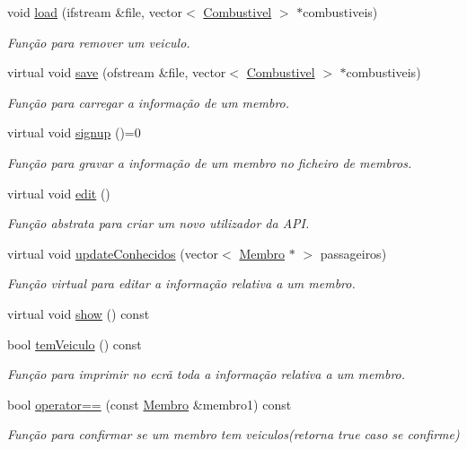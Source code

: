 \begin{DoxyCompactItemize}
void \hyperlink{class_membro_a3f6fcbde8bb6e631101e838e07240126}{load} (ifstream \&file, vector$<$ \hyperlink{class_combustivel}{Combustivel} $>$ $\ast$combustiveis)
\begin{DoxyCompactList}\small\item\em Função para remover um veiculo. \end{DoxyCompactList}\item 
virtual void \hyperlink{class_membro_a2a8ceaddac1fb7b0f894b1adc9315f03}{save} (ofstream \&file, vector$<$ \hyperlink{class_combustivel}{Combustivel} $>$ $\ast$combustiveis)
\begin{DoxyCompactList}\small\item\em Função para carregar a informação de um membro. \end{DoxyCompactList}\item 
virtual void \hyperlink{class_membro_ab88b510a234c18aa035c28f4253140b3}{signup} ()=0
\begin{DoxyCompactList}\small\item\em Função para gravar a informação de um membro no ficheiro de membros. \end{DoxyCompactList}\item 
virtual void \hyperlink{class_membro_a0e4aef4dc61b9f22b277591249714452}{edit} ()
\begin{DoxyCompactList}\small\item\em Função abstrata para criar um novo utilizador da A\+P\+I. \end{DoxyCompactList}\item 
virtual void \hyperlink{class_membro_a67dab9bc0fd069a6e3204044005c197f}{update\+Conhecidos} (vector$<$ \hyperlink{class_membro}{Membro} $\ast$ $>$ passageiros)
\begin{DoxyCompactList}\small\item\em Função virtual para editar a informação relativa a um membro. \end{DoxyCompactList}\item 
virtual void \hyperlink{class_membro_a9931c13a2894a9a62760a5dddb867997}{show} () const 
\item 
bool \hyperlink{class_membro_a2d507bc34837f55b91510a86d507d8bc}{tem\+Veiculo} () const 
\begin{DoxyCompactList}\small\item\em Função para imprimir no ecrã toda a informação relativa a um membro. \end{DoxyCompactList}\item 
bool \hyperlink{class_membro_a1561028d847eead98b720c339557262c}{operator==} (const \hyperlink{class_membro}{Membro} \&membro1) const 
\begin{DoxyCompactList}\small\item\em Função para confirmar se um membro tem veiculos(retorna true caso se confirme) \end{DoxyCompactList}\end{DoxyCompactItemize}
